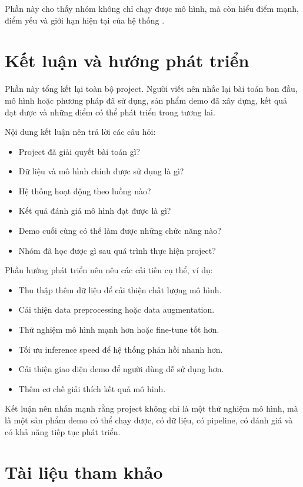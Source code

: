 \documentclass[12pt]{ai_conquer2026}
\begin{document}
Phần này cho thấy nhóm không chỉ chạy được mô hình, mà còn hiểu điểm mạnh, điểm yếu và giới hạn hiện tại của hệ thống .

\section{Kết luận và hướng phát triển}

Phần này tổng kết lại toàn bộ project. Người viết nên nhắc lại bài toán ban đầu, mô hình hoặc phương pháp đã sử dụng, sản phẩm demo đã xây dựng, kết quả đạt được và những điểm có thể phát triển trong tương lai.

Nội dung kết luận nên trả lời các câu hỏi:

\begin{itemize}
\item Project đã giải quyết bài toán gì?
\item Dữ liệu và mô hình chính được sử dụng là gì?
\item Hệ thống hoạt động theo luồng nào?
\item Kết quả đánh giá mô hình đạt được là gì?
\item Demo cuối cùng có thể làm được những chức năng nào?
\item Nhóm đã học được gì sau quá trình thực hiện project?
\end{itemize}

Phần hướng phát triển nên nêu các cải tiến cụ thể, ví dụ:

\begin{itemize}
\item Thu thập thêm dữ liệu để cải thiện chất lượng mô hình.
\item Cải thiện data preprocessing hoặc data augmentation.
\item Thử nghiệm mô hình mạnh hơn hoặc fine-tune tốt hơn.
\item Tối ưu inference speed để hệ thống phản hồi nhanh hơn.
\item Cải thiện giao diện demo để người dùng dễ sử dụng hơn.
\item Thêm cơ chế giải thích kết quả mô hình.

\end{itemize}

Kết luận nên nhấn mạnh rằng project không chỉ là một thử nghiệm mô hình, mà là một sản phẩm demo có thể chạy được, có dữ liệu, có pipeline, có đánh giá và có khả năng tiếp tục phát triển.

\newpage
\section{Tài liệu tham khảo}
\label{section:references}
\nocite{*}
\vspace{-3.2em}
\printbibliography
\end{document}
